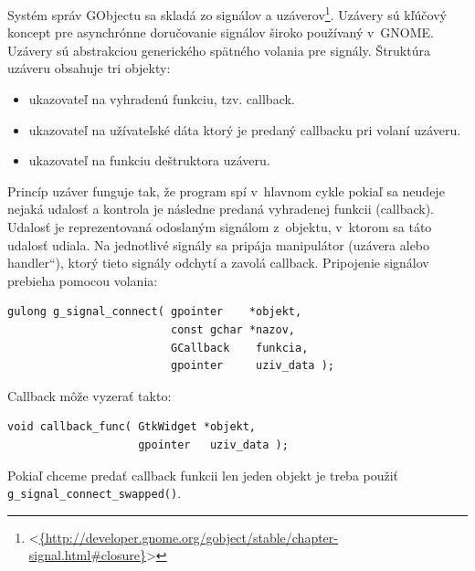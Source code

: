 \documentclass[12pt,oneside,final]{fithesis2}
\newcommand\uv[1]{\quotedblbase #1\textquotedblleft}
\begin{document}
Systém správ GObjectu sa skladá zo signálov a uzáverov\footnote{<\url{{http://developer.gnome.org/gobject/stable/chapter-signal.html\#closure}}>}. Uzávery sú kľúčový koncept pre asynchrónne doručovanie signálov široko používaný v~GNOME. Uzávery sú abstrakciou generického spätného volania pre signály. Štruktúra uzáveru obsahuje tri objekty:
\begin{itemize}
\item ukazovateľ na vyhradenú funkciu, tzv. callback.
\item ukazovateľ na užívateľské dáta ktorý je predaný callbacku pri volaní uzáveru.
\item ukazovateľ na funkciu deštruktora uzáveru.
\end{itemize}
Princíp uzáver funguje tak, že program spí v~hlavnom cykle pokiaľ sa neudeje nejaká udalosť a kontrola je následne predaná vyhradenej funkcii (callback). Udalosť je reprezentovaná odoslaným signálom z~objektu, v~ktorom sa táto udalosť udiala. Na jednotlivé signály sa pripája manipulátor (uzávera alebo \uv{handler}), ktorý tieto signály odchytí a zavolá callback. Pripojenie signálov prebieha pomocou volania:
\begin{verbatim}
gulong g_signal_connect( gpointer    *objekt,
                         const gchar *nazov,
                         GCallback    funkcia,
                         gpointer     uziv_data );
\end{verbatim} Callback môže vyzerať takto: 
\begin{verbatim}
void callback_func( GtkWidget *objekt,
                    gpointer   uziv_data );
\end{verbatim}
Pokiaľ chceme predať callback funkcii len jeden objekt je treba použiť \texttt{g\_\-signal\_\-connect\_\-swapped()}.
\end{document}
